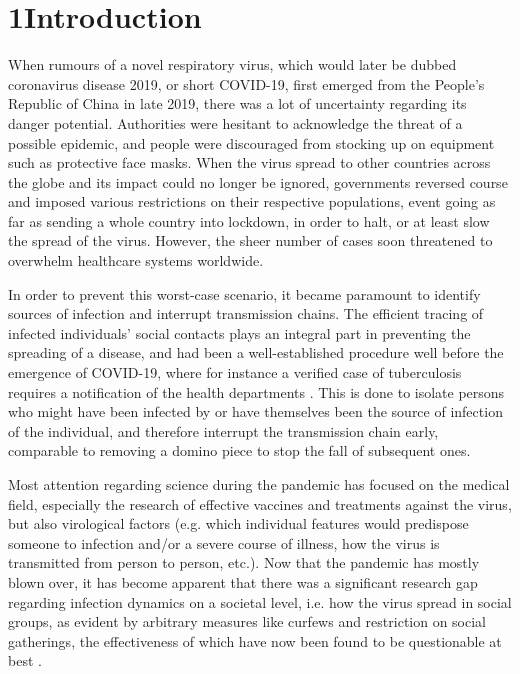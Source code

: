 \chapter{1\quad Introduction}
\label{ch:Introduction}

When rumours of a novel respiratory virus, which would later be dubbed coronavirus disease 2019, or short COVID-19, first emerged from the People's Republic of China in late 2019, there was a lot of uncertainty regarding its danger potential. Authorities were hesitant to acknowledge the threat of a possible epidemic, and people were discouraged from stocking up on equipment such as protective face masks. When the virus spread to other countries across the globe and its impact could no longer be ignored, governments reversed course and imposed various restrictions on their respective populations, event going as far as sending a whole country into lockdown, in order to halt, or at least slow the spread of the virus. However, the sheer number of cases soon threatened to overwhelm healthcare systems worldwide.

In order to prevent this worst-case scenario, it became paramount to identify sources of infection and interrupt transmission chains. The efficient tracing of infected individuals' social contacts plays an integral part in preventing the spreading of a disease, and had been a well-established procedure well before the emergence of COVID-19, where for instance a verified case of tuberculosis requires a notification of the health departments \cite{enwiki_1097839709}. This is done to isolate persons who might have been infected by or have themselves been the source of infection of the individual, and therefore interrupt the transmission chain early, comparable to removing a domino piece to stop the fall of subsequent ones.

Most attention regarding science during the pandemic has focused on the medical field, especially the research of effective vaccines and treatments against the virus, but also virological factors (e.g. which individual features would predispose someone to infection and/or a severe course of illness, how the virus is transmitted from person to person, etc.). Now that the pandemic has mostly blown over, it has become apparent that there was a significant research gap regarding infection dynamics on a societal level, i.e. how the virus spread in social groups, as evident by arbitrary measures like curfews and restriction on social gatherings, the effectiveness of which have now been found to be questionable at best .

